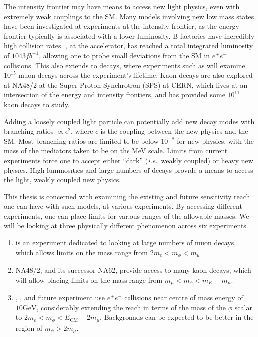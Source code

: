 \label{chapter:experiments}

The intensity frontier may have means to access new light physics, even with extremely weak couplings to the SM.
Many models involving new low mass states have been investigated at experiments at the intensity frontier, as the energy frontier typically is associated with a lower luminosity.
B-factories have incredibly high collision rates.
\belle, at the \kekb accelerator, has reached a total integrated luminosity of $1043fb^{-1}$, allowing one to probe small deviations from the SM in $e^+ e^-$ collisions.
This also extends to decays, where experiments such as \mueee will examine $10^{15}$ muon decays across the experiment's lifetime.
Kaon decays are also explored at NA48/2 at the Super Proton Synchrotron (SPS) at CERN, which lives at an intersection of the energy and intensity frontiers, and has provided some $10^{11}$ kaon decays to study.

Adding a loosely coupled light particle can potentially add new decay modes with branching ratios $\propto \epsilon^2$, where $\epsilon$ is the coupling between the new physics and the SM.
Most branching ratios are limited to be below $10^{-8}$ for new physics, with the mass of the mediators taken to be on the MeV scale.
Limits from current experiments force one to accept either ``dark'' ({\em i.e.}\ weakly coupled) or heavy new physics.
High luminosities and large numbers of decays provide a means to access the light, weakly coupled new physics.

This thesis is concerned with examining the existing and future sensitivity reach one can have with such models, at various experiments.
By accessing different experiments, one can place limits for various ranges of the allowable masses.
We will be looking at three physically different phenomenon across six experiments.
\begin{enumerate}
    \item \mueee is an experiment dedicated to looking at large numbers of muon decays, which allows limits on the mass range from $2 m_e < m_\phi < m_\mu$.
    \item NA48/2, and its successor NA62, provide access to many kaon decays, which will allow placing limits on the mass range from $m_\mu < m_\phi < m_K - m_\mu$.
    \item \babar, \belle, and future experiment \belletwo use $e^+ e^-$ collisions near centre of mass energy of $10\textrm{GeV}$, considerably extending the reach in terms of the mass of the $\phi$ scalar to $2m_e < m_\phi < E_\textrm{CM} - 2 m_\mu$. Backgrounds can be expected to be better in the region of $m_\phi > 2 m_\mu$.
\end{enumerate}

